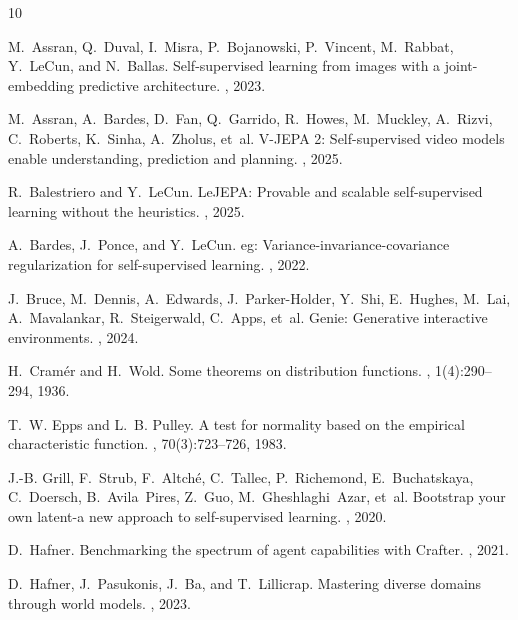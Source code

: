 \documentclass[11pt,letterpaper]{article}
\begin{document}
\clearpage

\begin{thebibliography}{10}

M.~Assran, Q.~Duval, I.~Misra, P.~Bojanowski, P.~Vincent, M.~Rabbat, Y.~LeCun, and N.~Ballas.
\newblock Self-supervised learning from images with a joint-embedding predictive architecture.
, 2023.

M.~Assran, A.~Bardes, D.~Fan, Q.~Garrido, R.~Howes, M.~Muckley, A.~Rizvi, C.~Roberts, K.~Sinha, A.~Zholus, et~al.
\newblock V-{JEPA} 2: Self-supervised video models enable understanding, prediction and planning.
, 2025.

R.~Balestriero and Y.~LeCun.
\newblock Le{JEPA}: Provable and scalable self-supervised learning without the heuristics.
, 2025.

A.~Bardes, J.~Ponce, and Y.~LeCun.
eg: Variance-invariance-covariance regularization for self-supervised learning.
, 2022.

J.~Bruce, M.~Dennis, A.~Edwards, J.~Parker-Holder, Y.~Shi, E.~Hughes, M.~Lai, A.~Mavalankar, R.~Steigerwald, C.~Apps, et~al.
\newblock Genie: Generative interactive environments.
, 2024.

H.~Cram{\'e}r and H.~Wold.
\newblock Some theorems on distribution functions.
, 1(4):290--294, 1936.

T.~W. Epps and L.~B. Pulley.
\newblock A test for normality based on the empirical characteristic function.
, 70(3):723--726, 1983.

J.-B. Grill, F.~Strub, F.~Altch{\'e}, C.~Tallec, P.~Richemond, E.~Buchatskaya, C.~Doersch, B.~Avila~Pires, Z.~Guo, M.~Gheshlaghi~Azar, et~al.
\newblock Bootstrap your own latent-a new approach to self-supervised learning.
, 2020.

D.~Hafner.
\newblock Benchmarking the spectrum of agent capabilities with {C}rafter.
, 2021.

D.~Hafner, J.~Pasukonis, J.~Ba, and T.~Lillicrap.
\newblock Mastering diverse domains through world models.
, 2023.


\end{thebibliography}
\end{document}
